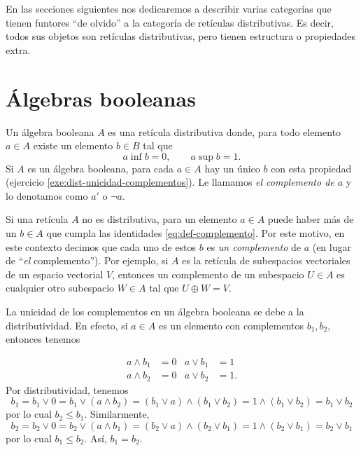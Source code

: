 En las secciones siguientes nos dedicaremos a describir varias
categorías que tienen funtores ``de olvido'' a la categoría de
retículas distributivas. Es decir, todos sus objetos son retículas
distributivas, pero tienen estructura o propiedades extra.

\section{Álgebras booleanas}
\label{ss:complementos-algebras-booleanas}

\begin{definition}\label{algb}
  Un álgebra booleana $A$ es una retícula distributiva
  donde, para todo elemento $a\in A$ existe un elemento $b\in B$ tal
  que
  \begin{equation}\label{eq:def-complemento}
    a\inf b = 0, \qquad a\sup b = 1.
  \end{equation}
  Si $A$ es un álgebra booleana, para cada $a\in A$ hay un único $b$
  con esta propiedad (ejercicio \ref{exe:dist-unicidad-complementos}).
  Le llamamos \emph{el complemento de $a$} y lo denotamos como $a'$ o
  $\neg a$.
\end{definition}

Si una retícula $A$ no es distributiva, para un elemento $a\in A$
puede haber más de un $b\in A$ que cumpla las identidades
\ref{eq:def-complemento}. Por este motivo, en este contexto decimos
que cada uno de estos $b$ es \emph{un complemento} de $a$ (en lugar de
``\emph{el} complemento'').
Por ejemplo, si $A$ es la retícula de
subespacios vectoriales de un espacio vectorial $V$,
entonces un complemento de un subespacio $U\in A$ es cualquier otro
subespacio $W\in A$ tal que $U\oplus W=V$.

La unicidad de los complementos en un álgebra booleana se debe
a la distributividad. En efecto, si $a\in A$ es un elemento con
complementos $b_1,b_2$, entonces tenemos

  \begin{align*}
    a\wedge b_1&=0 & a\vee b_1&=1 \\
    a\wedge b_2&=0 & a\vee b_2&=1.
  \end{align*}
  Por distributividad, tenemos
  \[
    b_1
    =b_1\vee 0
    =b_1\vee (a\wedge b_2)
    =(b_1\vee a)\wedge (b_1\vee b_2)
    =1\wedge (b_1\vee b_2)
    =b_1\vee b_2
  \]
  por lo cual $b_2\leq b_1$.
  Similarmente,
  \[
    b_2
    =b_2\vee 0
    =b_2\vee (a \wedge b_1)
    =(b_2\vee a)\wedge (b_2\vee b_1)
    =1\wedge (b_2\vee b_1)
    =b_2\vee b_1
  \]
  por lo cual $b_1\leq b_2$.
  Así, $b_1=b_2$.

